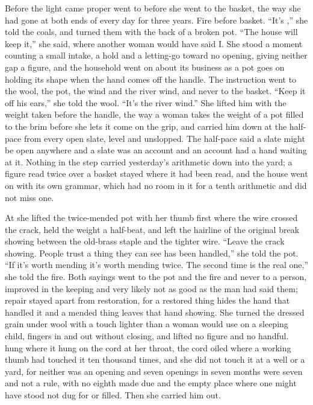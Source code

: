 \scenebreak

Before the light came proper  went to  before she went to the basket, the way she had gone at both ends of every day for three years. Fire before basket. “It's ,” she told the coals, and turned them with the back of a broken pot. “The house will keep it,” she said, where another woman would have said I. She stood a moment counting a small intake, a hold and a letting-go toward no opening, giving neither gap a figure, and the household went on about its business as a pot goes on holding its shape when the hand comes off the handle. The instruction went to the wool, the pot, the wind and the river wind, and never to the basket. “Keep it off his ears,” she told the wool. “It's the river wind.” She lifted him with the weight taken before the handle, the way a woman takes the weight of a pot filled to the brim before she lets it come on the grip, and carried him down at the half-pace from every open slate, level and unslopped. The half-pace said a slate might be open anywhere and a slate was an account and an account had a hand waiting at it. Nothing in the step carried yesterday's arithmetic down into the yard; a figure read twice over a basket stayed where it had been read, and the house went on with its own grammar, which had no room in it for a tenth arithmetic and did not miss one.

At  she lifted the twice-mended pot with her thumb first where the wire crossed the crack, held the weight a half-beat, and left the hairline of the original break showing between the old-brass staple and the tighter wire. “Leave the crack showing. People trust a thing they can see has been handled,” she told the pot. “If it's worth mending it's worth mending twice. The second time is the real one,” she told the fire. Both sayings went to the pot and the fire and never to a person, improved in the keeping and very likely not as good as the man had said them; repair stayed apart from restoration, for a restored thing hides the hand that handled it and a mended thing leaves that hand showing. She turned the dressed grain under wool with a touch lighter than a woman would use on a sleeping child, fingers in and out without closing, and lifted no figure and no handful.  hung where it hung on the cord at her throat, the cord oiled where a working thumb had touched it ten thousand times, and she did not touch it at a well or a yard, for neither was an opening and seven openings in seven months were seven and not a rule, with no eighth made due and the empty place where one might have stood not dug for or filled. Then she carried him out.

